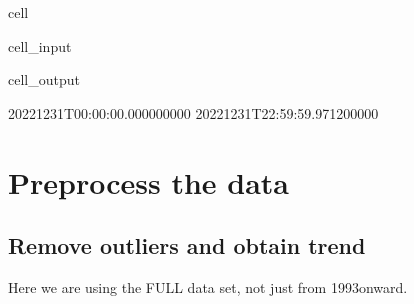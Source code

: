 \documentclass[letterpaper,10pt,english]{jupyterBook}
\begin{document}
\begin{sphinxuseclass}{cell}
\begin{sphinxVerbatimInput}
\begin{sphinxuseclass}{cell_input}
\begin{sphinxVerbatim}[commandchars=\\\{\}]
     
     

\PYG{p}{[}\PYG{p}{]}
\PYG{p}{[}\PYG{p}{]}
\end{sphinxVerbatim}

\end{sphinxuseclass}\end{sphinxVerbatimInput}
\begin{sphinxVerbatimOutput}

\begin{sphinxuseclass}{cell_output}
\begin{sphinxVerbatim}[commandchars=\\\{\}]
2022\PYGZhy{}12\PYGZhy{}31T00:00:00.000000000
2022\PYGZhy{}12\PYGZhy{}31T22:59:59.971200000
\end{sphinxVerbatim}

\end{sphinxuseclass}\end{sphinxVerbatimOutput}

\end{sphinxuseclass}

\part{Pre\sphinxhyphen{}process the data}
\label{\detokenize{notebooks/regional_and_local/SL_Extremes_annual:pre-process-the-data}}

\chapter{Remove outliers and obtain trend}
\label{\detokenize{notebooks/regional_and_local/SL_Extremes_annual:remove-outliers-and-obtain-trend}}
\sphinxAtStartPar
Here we are using the FULL data set, not just from 1993\sphinxhyphen{}onward.
\end{document}
